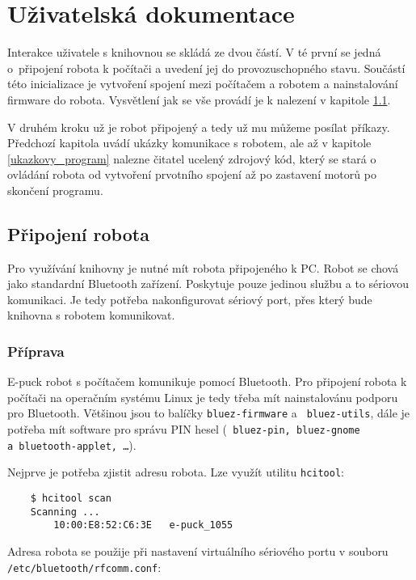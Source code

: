 \chapter{Uživatelská dokumentace}
\label{dokumentace}

    Interakce uživatele s knihovnou se skládá ze dvou částí. V té první se
    jedná o~připojení robota k počítači a uvedení jej do provozuschopného
    stavu. Součástí této inicializace je vytvoření spojení mezi počítačem a
    robotem a nainstalování firmware do robota. Vysvětlení jak se vše provádí
    je k nalezení v kapitole \ref{pripojeni_robota}.

    V druhém kroku už je robot připojený a tedy už mu můžeme posílat příkazy.
    Předchozí kapitola uvádí ukázky komunikace s robotem, ale až v kapitole
    \ref{ukazkovy_program} nalezne čitatel ucelený zdrojový kód, který se stará
    o ovládání robota od vytvoření prvotního spojení až po zastavení motorů po
    skončení programu.

    \section{Připojení robota}
    \label{pripojeni_robota}

    Pro využívání knihovny je nutné mít robota připojeného k PC. Robot se chová
    jako standardní Bluetooth zařízení. Poskytuje pouze jedinou službu a to
    sériovou komunikaci. Je tedy potřeba nakonfigurovat sériový port, přes
    který bude knihovna s robotem komunikovat.

    \subsection{Příprava}

    E-puck robot s počítačem komunikuje pomocí Bluetooth. Pro připojení robota
    k počítači na operačním systému Linux je tedy třeba mít nainstalovánu
    podporu pro Bluetooth. Většinou jsou to balíčky {\tt bluez-firmware} a {\tt
    bluez-utils}, dále je potřeba mít software pro správu PIN hesel ({\tt
    bluez-pin, bluez-gnome a~bluetooth-applet, \ldots}).

    Nejprve je potřeba zjistit adresu robota. Lze využít utilitu {\tt hcitool}:

    \begin{verbatim}
    $ hcitool scan
    Scanning ...
        10:00:E8:52:C6:3E	e-puck_1055
    \end{verbatim}

    Adresa robota se použije při nastavení virtuálního sériového portu v
    souboru {\tt /etc/bluetooth/rfcomm.conf}:

